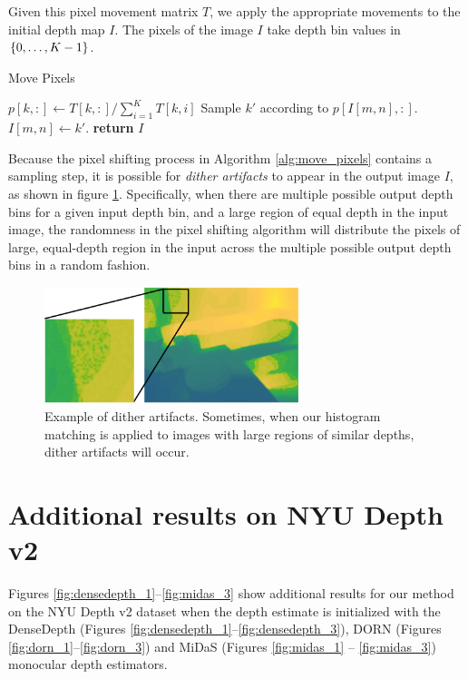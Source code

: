 \documentclass[runningheads]{llncs}
\begin{document}
Given this pixel movement matrix $T$, we apply the appropriate movements to the
initial depth map $I$. The pixels of the image $I$ take depth bin values in $\{0,\ldots,K-1\}$. 
{ \footnotesize
  \begin{algorithm}[H]
    \caption{Move Pixels}
    \label{alg:move_pixels}
    \begin{algorithmic}
      \footnotesize
        \State $p[k,:] \gets T[k,:]/\sum_{i=1}^K T[k,i]$
      \EndFor
          \State Sample $k'$ according to $p[I[m,n],:]$.
          \State $I[m,n] \gets k'$.
        \EndFor
      \EndFor
      \State \textbf{return} $I$
      \EndProcedure
    \end{algorithmic}
  \end{algorithm}
} Because the pixel shifting process in Algorithm \ref{alg:move_pixels} contains
a sampling step, it is possible for
\textit{dither artifacts} to appear in the output image $I$, as shown in figure
\ref{fig:dither}. Specifically, when there are multiple possible output depth
bins for a given input depth bin, and a large region of equal depth in the input
image, the randomness in the pixel shifting algorithm will distribute the pixels
of large, equal-depth region in the input across the multiple possible output
depth bins in a random fashion.

\begin{figure}[H]
  \centering \includegraphics[width=0.66\textwidth]{dither.pdf}
  \caption{Example of dither artifacts. Sometimes, when our histogram matching
    is applied to images with large regions of similar depths, dither artifacts
    will occur.}
  \label{fig:dither}
\end{figure}

\clearpage
\section{Additional results on NYU Depth v2}
Figures \ref{fig:densedepth_1}--\ref{fig:midas_3} show additional results
for our method on the NYU Depth v2 dataset when the depth estimate is
initialized with the DenseDepth \cite{Alhashim2018} (Figures
\ref{fig:densedepth_1}--\ref{fig:densedepth_3}), DORN \cite{Fu2018} (Figures
\ref{fig:dorn_1}--\ref{fig:dorn_3}) 
and MiDaS \cite{Lasinger:2019} (Figures \ref{fig:midas_1} -- \ref{fig:midas_3}) monocular depth estimators.
\end{document}
